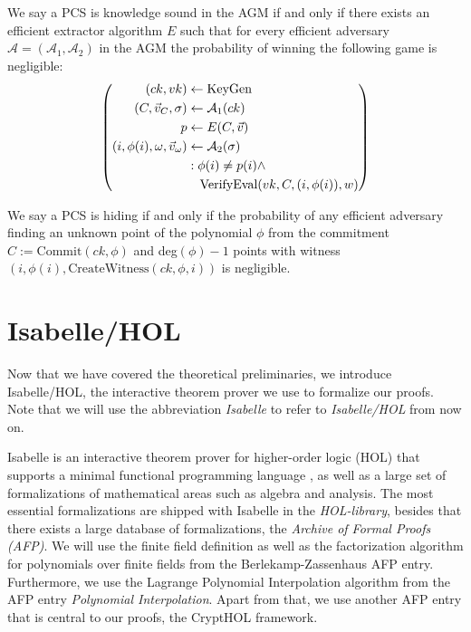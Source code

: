 \begin{definition}
    \label{knowledgesound_def}
    We say a PCS is knowledge sound in the AGM if and only if there exists an efficient extractor algorithm $E$ such that for every efficient adversary $\mathcal{A}=(\mathcal{A}_1, \mathcal{A}_2)$ in the AGM the probability of winning the following game is negligible: 
    \begin{equation*}
        \left(
            \begin{aligned}
                (ck,vk) & \leftarrow \text{KeyGen} \\
                (C,\vec{v}_C, \sigma) & \leftarrow \mathcal{A}_1(ck)\\
                p & \leftarrow E(C,\vec{v}) \\
                (i, \phi(i), \omega, \vec{v}_{\omega}) &\leftarrow \mathcal{A}_2(\sigma)\\
                & : \phi(i) \ne p(i) \land \\
                & \hspace{3.5mm} \text{VerifyEval}(vk, C,(i,\phi(i)),w)
            \end{aligned}
        \right)
    \end{equation*}
    \parencite{plonk}
\end{definition}

\begin{definition}[hiding]
    \label{hiding_def}
    We say a PCS is hiding if and only if the probability of any efficient adversary finding an unknown point of the polynomial $\phi$ from the commitment $C:=\text{Commit}(ck,\phi)$ and deg$(\phi)-1$ points with witness  $(i,\phi(i),\text{CreateWitness}(ck, \phi, i))$ is negligible.
    \parencite{KZG}
\end{definition}

\section{Isabelle/HOL}
Now that we have covered the theoretical preliminaries, we introduce Isabelle/HOL\parencite{Isabelle}, the interactive theorem prover we use to formalize our proofs. 
Note that we will use the abbreviation \textit{Isabelle} to refer to \textit{Isabelle/HOL} from now on. 

Isabelle is an interactive theorem prover for higher-order logic (HOL) that supports a minimal functional programming language \parencite{isabelle_manual}, as well as a large set of formalizations of mathematical areas such as algebra and analysis. The most essential formalizations are shipped with Isabelle in the \textit{HOL-library}, besides that there exists a large database of formalizations, the \textit{Archive of Formal Proofs (AFP)}\parencite{AFP_online}. We will use the finite field definition as well as the factorization algorithm for polynomials over finite fields from the Berlekamp-Zassenhaus\parencite{Berlekamp_Zassenhaus-AFP} AFP entry. Furthermore, we use the Lagrange Polynomial Interpolation algorithm from the AFP entry \textit{Polynomial Interpolation}\parencite{Polynomial_Interpolation-AFP}.
Apart from that, we use another AFP entry that is central to our proofs, the CryptHOL framework\parencite{CryptHOL-AFP}.

